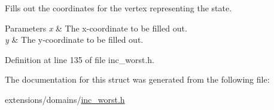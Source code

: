 Fills out the coordinates for the vertex representing the state. 


\begin{DoxyParams}{Parameters}
{\em x} & The x-\/coordinate to be filled out. \\
\hline
{\em y} & The y-\/coordinate to be filled out. \\
\hline
\end{DoxyParams}


Definition at line 135 of file inc\+\_\+worst.\+h.



The documentation for this struct was generated from the following file\+:\begin{DoxyCompactItemize}
\item 
extensions/domains/\hyperlink{inc__worst_8h}{inc\+\_\+worst.\+h}\end{DoxyCompactItemize}
